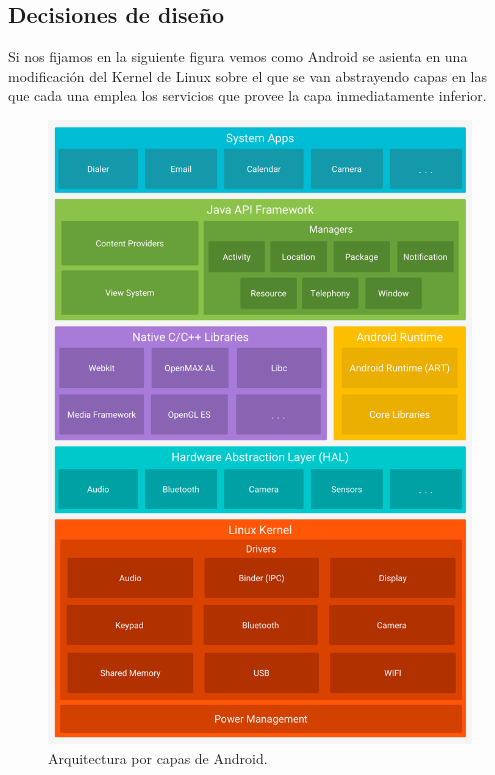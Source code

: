 \documentclass[12pt,a4paper,oneside]{book} %
\begin{document}
\subsection{Decisiones de diseño}
Si nos fijamos en la siguiente figura vemos como Android se asienta en una modificación del Kernel de Linux sobre el que se van abstrayendo capas en las que cada una emplea los servicios que provee la capa inmediatamente inferior. 
\begin{figure}[H]
	\begin{center}
		\includegraphics[scale=0.15]{pictures/architecture/android_stack.png} %
	\end{center}
	\caption[Android stack]{Arquitectura por capas de Android.}
\end{figure}
\end{document}
